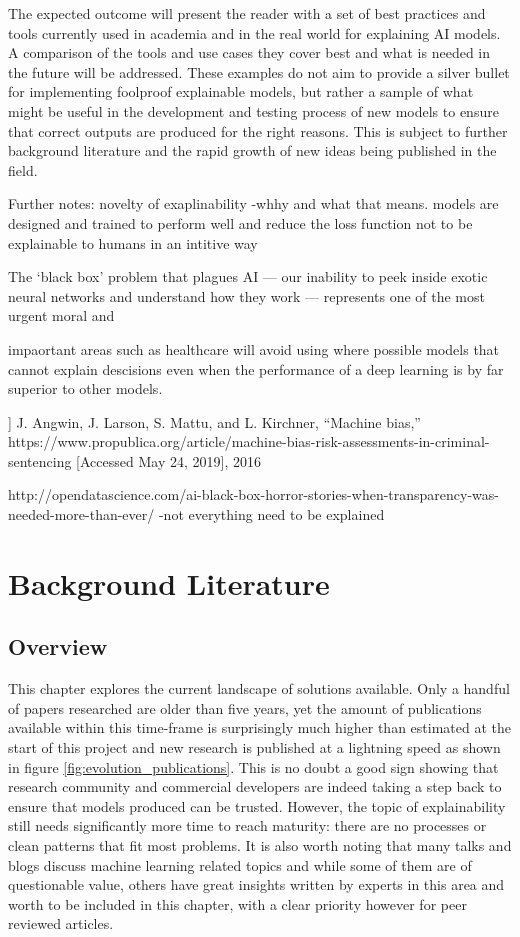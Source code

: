 \documentclass[proposal]{softeng}
\begin{document}
The expected outcome will present the reader with a set of best practices and tools currently used in academia and in the real world for explaining AI models. A comparison of the tools and use cases they cover best and what is needed in the future will be addressed. These examples do not aim to provide a silver bullet for implementing foolproof explainable models, but rather a sample of what might be useful in the development and testing process of new models to ensure that correct outputs are produced for the right reasons. This is subject to further background literature and the rapid growth of new ideas being published in the field.

Further notes:
novelty of exaplinability -whhy and what that means. models are designed and trained to perform well and reduce the loss function not to be explainable to humans in an intitive way
 
 The ‘black box’ problem that plagues AI — our inability to peek inside exotic neural networks and understand how they work — represents one of the most urgent moral and %

impaortant areas such as healthcare will avoid using where possible models that cannot explain descisions even when the performance of a deep learning is by far superior to other models.

] J. Angwin, J. Larson, S. Mattu, and L. Kirchner, “Machine bias,”
https://www.propublica.org/article/machine-bias-risk-assessments-in-criminal-sentencing
[Accessed May 24, 2019], 2016

http://opendatascience.com/ai-black-box-horror-stories-when-transparency-was-needed-more-than-ever/
-not everything need to be explained

\newpage
\section{Background Literature}
\subsection{Overview}
This chapter explores the current landscape of solutions available. Only a handful of papers researched are older than five years, yet the amount of publications available within this time-frame is surprisingly much higher than estimated at the start of this project and new research is published at a lightning speed as shown in figure \ref{fig:evolution_publications}. This is no doubt a good sign showing that research community and commercial developers are indeed taking a step back to ensure that models produced can be trusted. However, the topic of explainability still needs significantly more time to reach maturity: there are no processes or clean patterns that fit most problems. It is also worth noting that many talks and blogs discuss machine learning related topics and while some of them are of questionable value, others have great insights written by experts in this area and worth to be included in this chapter, with a clear priority however for peer reviewed articles.
\end{document}

